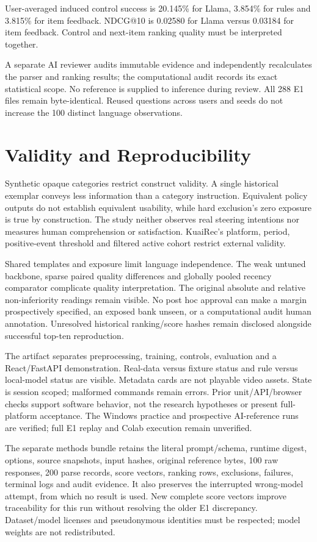 \documentclass[conference]{IEEEtran}
\begin{document}
User-averaged induced control success is 20.145\% for Llama, 3.854\% for rules and 3.815\% for item feedback. NDCG@10 is 0.02580 for Llama versus 0.03184 for item feedback. Control and next-item ranking quality must be interpreted together.

A separate AI reviewer audits immutable evidence and independently recalculates the parser and ranking results; the computational audit records its exact statistical scope. No reference is supplied to inference during review. All 288 E1 files remain byte-identical. Reused questions across users and seeds do not increase the 100 distinct language observations.

\section{Validity and Reproducibility}
Synthetic opaque categories restrict construct validity. A single historical exemplar conveys less information than a category instruction. Equivalent policy outputs do not establish equivalent usability, while hard exclusion's zero exposure is true by construction. The study neither observes real steering intentions nor measures human comprehension or satisfaction. KuaiRec's platform, period, positive-event threshold and filtered active cohort restrict external validity.

Shared templates and exposure limit language independence. The weak untuned backbone, sparse paired quality differences and globally pooled recency comparator complicate quality interpretation. The original absolute and relative non-inferiority readings remain visible. No post hoc approval can make a margin prospectively specified, an exposed bank unseen, or a computational audit human annotation. Unresolved historical ranking/score hashes remain disclosed alongside successful top-ten reproduction.

The artifact separates preprocessing, training, controls, evaluation and a React/FastAPI demonstration. Real-data versus fixture status and rule versus local-model status are visible. Metadata cards are not playable video assets. State is session scoped; malformed commands remain errors. Prior unit/API/browser checks support software behavior, not the research hypotheses or present full-platform acceptance. The Windows practice and prospective AI-reference runs are verified; full E1 replay and Colab execution remain unverified.

The separate methods bundle retains the literal prompt/schema, runtime digest, options, source snapshots, input hashes, original reference bytes, 100 raw responses, 200 parse records, score vectors, ranking rows, exclusions, failures, terminal logs and audit evidence. It also preserves the interrupted wrong-model attempt, from which no result is used. New complete score vectors improve traceability for this run without resolving the older E1 discrepancy. Dataset/model licenses and pseudonymous identities must be respected; model weights are not redistributed.
\end{document}
